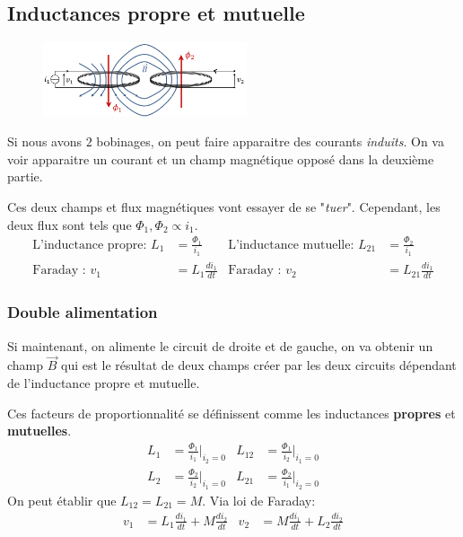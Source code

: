 \documentclass{report}
\begin{document}
\subsection{Inductances propre et mutuelle}
\begin{figure}
\centering
\includegraphics[width=6cm]{img/fluxMagnetique.png} 
\label{fig:mutuelle}
\end{figure}
Si nous avons $2$ bobinages, on peut faire apparaitre des courants \textit{induits}. On va voir apparaitre un courant et un champ magnétique opposé dans la deuxième partie. \par 
Ces deux champs et flux magnétiques vont essayer de se "\textit{tuer}". Cependant, les deux flux sont tels que $\Phi_1, \Phi_2 \propto i_1$.
\begin{align*}
\text{L'inductance propre: } L_1 &= \frac{\Phi_1}{i_1} & \text{L'inductance mutuelle: }  L_{21} &= \frac{\Phi_2}{i_1}\\
\text{Faraday : } v_1 &= L_1 \frac{di_1}{dt} & \text{Faraday : } v_2 &= L_{21} \frac{di_1}{dt}
\end{align*}

\subsubsection{Double alimentation}
Si maintenant, on alimente le circuit de droite et de gauche, on va obtenir un champ $\overrightarrow{B}$ qui est le résultat de deux champs créer par les deux circuits dépendant de l'inductance propre et mutuelle.\par
Ces facteurs de proportionnalité se définissent comme les inductances \textbf{propres} et \textbf{mutuelles}.
\begin{align*}
L_1 &=  \frac{\Phi_1}{i_1} \bigg|_{i_2 = 0} & L_{12} &=  \frac{\Phi_1}{i_2} \bigg|_{i_1 = 0} \\
L_2 &=  \frac{\Phi_2}{i_2} \bigg|_{i_1 = 0} & L_{21} &=  \frac{\Phi_2}{i_1} \bigg|_{i_2 = 0}
\end{align*}
On peut établir que $L_{12} = L_{21} = M$. Via loi de Faraday:
\begin{align*}
v_1 &= L_1 \frac{di_1}{dt} + M \frac{di_2}{dt} & v_2 &= M \frac{di_1}{dt} + L_2 \frac{di_2}{dt}
\end{align*}
\end{document}
